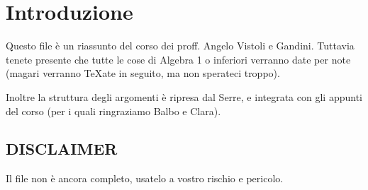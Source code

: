 \section*{Introduzione}
  Questo file è un riassunto del corso dei proff. Angelo Vistoli e Gandini. Tuttavia tenete presente che tutte le cose di Algebra 1 o inferiori verranno date per note (magari verranno \TeX ate in seguito, ma non sperateci troppo).
  
  Inoltre la struttura degli argomenti è ripresa dal Serre, e integrata con gli appunti del corso (per i quali ringraziamo Balbo e Clara).

  \subsection*{DISCLAIMER}
    Il file non è ancora completo, usatelo a vostro rischio e pericolo.
